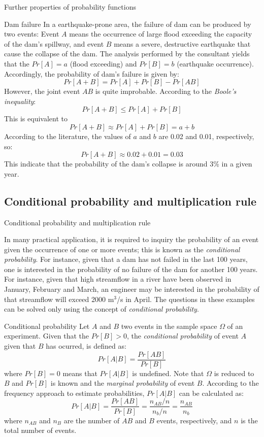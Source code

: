\documentclass[8pt]{beamer}
\begin{document}
\begin{frame}{Further properties of probability functions}
    \begin{exampleblock}{Dam failure}
        In a earthquake-prone area, the failure of dam can be produced by two events: Event $A$ means the occurrence of large flood exceeding the capacity of the dam's spillway, and event $B$ means a severe, destructive earthquake that cause the collapse of the dam. The analysis performed by the consultant yields that the $Pr[A] = a$ (flood exceeding) and $Pr[B] = b$ (earthquake occurrence). Accordingly, the probability of dam's failure is given by:
        $$
        Pr[A + B] = Pr[A] + Pr[B] - Pr[AB]
        $$
        However, the joint event $AB$ is quite improbable. According to the \emph{Boole's inequality}:
        $$
        Pr[A + B] \leq Pr[A] + Pr[B]
        $$
        This is equivalent to 
        $$
        Pr[A + B] \approx Pr[A] + Pr[B] = a + b
        $$
        According to the literature, the values of $a$ and $b$ are 0.02 and 0.01, respectively, so:
        $$
        Pr[A + B] \approx 0.02 + 0.01 = 0.03
        $$
        This indicate that the probability of the dam's collapse is around 3\% in a given year. 
    \end{exampleblock}
\end{frame}

\subsection{Conditional probability and multiplication rule}
\begin{frame}{Conditional probability and multiplication rule}
    
    In many practical application, it is required to inquiry the probability of an event given the occurrence of one or more events; this is known as the \emph{conditional probability}. For instance, given that a dam has not failed in the last 100 years, one is interested in the probability of no failure of the dam for another 100 years. For instance, given that high streamflow in a river have been observed in January, February and March, an engineer may be interested in the probability of that streamflow will exceed 2000 m$^3$/s in April. The questions in these examples can be solved only using the concept of \emph{conditional probability}. 
    \begin{block}{Conditional probability}
        Let $A$ and $B$ two events in the sample space $\Omega$ of an experiment. Given that the $Pr[B] > 0$, the \emph{conditional probability} of event $A$ given that $B$ has ocurred, is defined as:
        $$
        Pr[A | B] = \frac{Pr[AB]}{Pr[B]}
        $$
        where $Pr[B] = 0$ means that $Pr[A | B]$ is undefined. Note that $\Omega$ is reduced to $B$ and $Pr[B]$ is known and the \emph{marginal probability} of event $B$. According to the frequency approach to estimate probabilities, $Pr[A | B]$ can be calculated as:
        $$
        Pr[A | B] = \frac{Pr[AB]}{Pr[B]} = \frac{n_{AB} /n}{n_b /n} = \frac{n_{AB}}{n_b}
        $$
        where $n_{AB}$ and $n_B$ are the number of $AB$ and $B$ events, respectively, and $n$ is the total number of events. 
    \end{block}
\end{frame}
\end{document}
